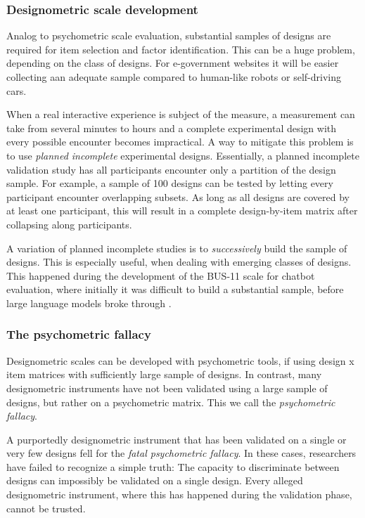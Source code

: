 \documentclass[
  authoryear,
  review]{elsarticle}
\begin{document}
\subsubsection{Designometric scale development}\label{sec-dmx-scale-dev}

Analog to psychometric scale evaluation, substantial samples of designs
are required for item selection and factor identification. This can be a
huge problem, depending on the class of designs. For e-government
websites it will be easier collecting aan adequate sample compared to
human-like robots or self-driving cars.

When a real interactive experience is subject of the measure, a
measurement can take from several minutes to hours and a complete
experimental design with every possible encounter becomes impractical. A
way to mitigate this problem is to use \emph{planned incomplete}
experimental designs. Essentially, a planned incomplete validation study
has all participants encounter only a partition of the design sample.
For example, a sample of 100 designs can be tested by letting every
participant encounter overlapping subsets. As long as all designs are
covered by at least one participant, this will result in a complete
design-by-item matrix after collapsing along participants.

A variation of planned incomplete studies is to \emph{successively}
build the sample of designs. This is especially useful, when dealing
with emerging classes of designs. This happened during the development
of the BUS-11 scale for chatbot evaluation, where initially it was
difficult to build a substantial sample, before large language models
broke through \citep{Borsci2024}.

\subsubsection{The psychometric fallacy}\label{the-psychometric-fallacy}

Designometric scales can be developed with psychometric tools, if using
design x item matrices with sufficiently large sample of designs. In
contrast, many designometric instruments have not been validated using a
large sample of designs, but rather on a psychometric matrix. This we
call the \emph{psychometric fallacy}.

A purportedly designometric instrument that has been validated on a
single or very few designs fell for the \emph{fatal psychometric
fallacy}. In these cases, researchers have failed to recognize a simple
truth: The capacity to discriminate between designs can impossibly be
validated on a single design. Every alleged designometric instrument,
where this has happened during the validation phase, cannot be trusted.
\end{document}
